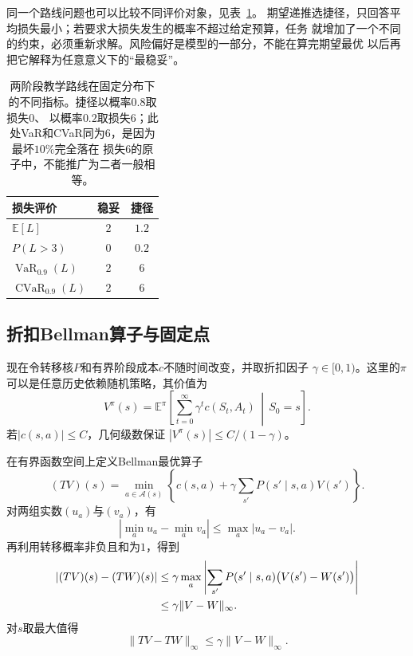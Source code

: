 同一个路线问题也可以比较不同评价对象，见表~\ref{tab:decision-route-risk-criteria}。
期望递推选捷径，只回答平均损失最小；若要求大损失发生的概率不超过给定预算，任务
就增加了一个不同的约束，必须重新求解。风险偏好是模型的一部分，不能在算完期望最优
以后再把它解释为任意意义下的“最稳妥”。

\begin{table}[htbp]
  \centering
  \begin{tabular}{lcc}
    \toprule
    损失评价 & 稳妥 & 捷径\\
    \midrule
    $\mathbb E[L]$ & $2$ & $1.2$\\
    $P(L>3)$ & $0$ & $0.2$\\
    $\operatorname{VaR}_{0.9}(L)$ & $2$ & $6$\\
    $\operatorname{CVaR}_{0.9}(L)$ & $2$ & $6$\\
    \bottomrule
  \end{tabular}
  \caption{两阶段教学路线在固定分布下的不同指标。捷径以概率$0.8$取损失$0$、
  以概率$0.2$取损失$6$；此处VaR和CVaR同为$6$，是因为最坏$10\%$完全落在
  损失$6$的原子中，不能推广为二者一般相等。}
  \label{tab:decision-route-risk-criteria}
\end{table}

\subsection{折扣Bellman算子与固定点}
现在令转移核\(P\)和有界阶段成本\(c\)不随时间改变，并取折扣因子
\(\gamma\in[0,1)\)。这里的\(\pi\)可以是任意历史依赖随机策略，其价值为
\begin{equation}
  V^\pi(s)
  =
  \mathbb{E}^\pi\left[
    \sum_{t=0}^{\infty}\gamma^t c(S_t,A_t)
    \,\middle|\,S_0=s
  \right].
  \label{eq:decision-discounted-value}
\end{equation}
若\(|c(s,a)|\leq C\)，几何级数保证
\(|V^\pi(s)|\leq C/(1-\gamma)\)。

在有界函数空间上定义Bellman最优算子
\begin{equation}
  (TV)(s)
  =
  \min_{a\in\mathcal{A}(s)}
  \left\{
    c(s,a)+
    \gamma\sum_{s'}P(s'\mid s,a)V(s')
  \right\}.
  \label{eq:decision-discounted-bellman-operator}
\end{equation}
对两组实数\((u_a)\)与\((v_a)\)，有
\[
  \left|\min_a u_a-\min_a v_a\right|
  \leq\max_a|u_a-v_a|.
\]
再利用转移概率非负且和为\(1\)，得到
\begin{align}
  |(TV)(s)-(TW)(s)|
  &\leq
  \gamma\max_a
  \left|
    \sum_{s'}P(s'\mid s,a)
    \bigl(V(s')-W(s')\bigr)
  \right|
  \notag\\
  &\leq
  \gamma\lVert V-W\rVert_\infty.
  \label{eq:decision-bellman-contraction-pointwise}
\end{align}
对\(s\)取最大值得
\begin{equation}
  \lVert TV-TW\rVert_\infty
  \leq
  \gamma\lVert V-W\rVert_\infty.
  \label{eq:decision-bellman-contraction}
\end{equation}

